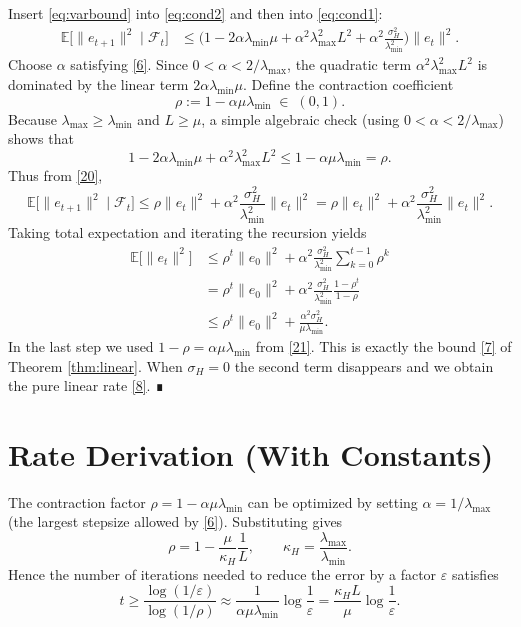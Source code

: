 \documentclass{article}
\newcommand{\E}{\mathbb{E}}
\begin{document}
Insert \eqref{eq:varbound} into \eqref{eq:cond2} and then into \eqref{eq:cond1}:
\begin{align}
\E\!\big[\|e_{t+1}\|^{2}\mid\mathcal{F}_{t}\big]
   &\le\Big(1-2\alpha\lambda_{\min}\mu+\alpha^{2}\lambda_{\max}^{2}L^{2}
          +\alpha^{2}\frac{\sigma_{H}^{2}}{\lambda_{\min}^{2}}\Big)\|e_{t}\|^{2}.
   \tag{20}
\end{align}
Choose $\alpha$ satisfying \eqref{6}.  Since $0<\alpha<2/\lambda_{\max}$, the quadratic term $\alpha^{2}\lambda_{\max}^{2}L^{2}$ is dominated by the linear term $2\alpha\lambda_{\min}\mu$.  Define the contraction coefficient
\[
\rho:=1-\alpha\mu\lambda_{\min}\;\in\;(0,1).
\tag{21}
\]
Because $\lambda_{\max}\ge\lambda_{\min}$ and $L\ge\mu$, a simple algebraic check (using $0<\alpha<2/\lambda_{\max}$) shows that
\[
1-2\alpha\lambda_{\min}\mu+\alpha^{2}\lambda_{\max}^{2}L^{2}
   \le 1-\alpha\mu\lambda_{\min}= \rho.
\tag{22}
\]
Thus from \eqref{20},
\[
\E\!\big[\|e_{t+1}\|^{2}\mid\mathcal{F}_{t}\big]
   \le \rho\|e_{t}\|^{2}+\alpha^{2}\frac{\sigma_{H}^{2}}{\lambda_{\min}^{2}}\|e_{t}\|^{2}
   =\rho\|e_{t}\|^{2}+ \alpha^{2}\frac{\sigma_{H}^{2}}{\lambda_{\min}^{2}}\|e_{t}\|^{2}.
\tag{23}
\]
Taking total expectation and iterating the recursion yields
\begin{align}
\E\!\big[\|e_{t}\|^{2}\big]
   &\le \rho^{t}\|e_{0}\|^{2}
      +\alpha^{2}\frac{\sigma_{H}^{2}}{\lambda_{\min}^{2}}
        \sum_{k=0}^{t-1}\rho^{k}
      \tag{24}\\
   &= \rho^{t}\|e_{0}\|^{2}
      +\alpha^{2}\frac{\sigma_{H}^{2}}{\lambda_{\min}^{2}}\frac{1-\rho^{t}}{1-\rho}
      \tag{25}\\
   &\le \rho^{t}\|e_{0}\|^{2}
      +\frac{\alpha^{2}\sigma_{H}^{2}}{\mu\lambda_{\min}}.
      \tag{26}
\end{align}
In the last step we used $1-\rho=\alpha\mu\lambda_{\min}$ from \eqref{21}.  This is exactly the bound \eqref{7} of Theorem \ref{thm:linear}.  When $\sigma_{H}=0$ the second term disappears and we obtain the pure linear rate \eqref{8}.  ∎

\section*{Rate Derivation (With Constants)}
The contraction factor $\rho=1-\alpha\mu\lambda_{\min}$ can be optimized by setting $\alpha=1/\lambda_{\max}$ (the largest stepsize allowed by \eqref{6}).  Substituting gives
\[
\rho=1-\frac{\mu}{\kappa_{H}}\frac{1}{L},
\qquad
\kappa_{H}=\frac{\lambda_{\max}}{\lambda_{\min}}.
\tag{27}
\]
Hence the number of iterations needed to reduce the error by a factor $\varepsilon$ satisfies
\[
t\ge \frac{\log(1/\varepsilon)}{\log(1/\rho)}
   \approx \frac{1}{\alpha\mu\lambda_{\min}}\log\frac{1}{\varepsilon}
   = \frac{\kappa_{H}L}{\mu}\log\frac{1}{\varepsilon}.
\tag{28}
\]
\end{document}
